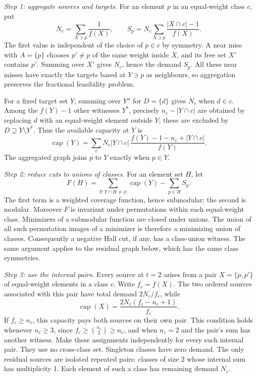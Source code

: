 \documentclass[11pt]{article}
\theoremstyle{plain}
\begin{document}
\emph{Step 1: aggregate sources and targets.} For an element $p$ in an equal-weight class $c$, put
\[
N_c=\sum_{X\ni p}\frac1{f(X)},\qquad
S_p=N_c\sum_{X\ni p}\frac{|X\cap c|-1}{f(X)}.
\]
The first value is independent of the choice of $p\in c$ by symmetry. A near miss with $A=\{p\}$ chooses $p'\ne p$ of the same weight inside $X$, and its free set $X'$ contains $p'$. Summing over $X'$ gives $N_c$, hence the demand $S_p$. All these near misses have exactly the targets based at $Y\ni p$ as neighbours, so aggregation preserves the fractional feasibility problem.

For a fixed target set $Y$, summing over $Y''$ for $D=\{d\}$ gives $N_c$ when $d\in c$. Among the $f(Y)-1$ other witnesses $Y^*$, precisely $n_c-|Y\cap c|$ are obtained by replacing $d$ with an equal-weight element outside $Y$; these are excluded by $D\supseteq Y\setminus Y^*$. Thus the available capacity at $Y$ is
\[
\operatorname{cap}(Y)=\sum_c N_c|Y\cap c|\,
\frac{f(Y)-1-n_c+|Y\cap c|}{f(Y)}.
\]
The aggregated graph joins $p$ to $Y$ exactly when $p\in Y$.

\emph{Step 2: reduce cuts to unions of classes.} For an element set $H$, let
\[
F(H)=\sum_{Y:Y\cap H\ne\varnothing}\operatorname{cap}(Y)-\sum_{p\in H}S_p.
\]
The first term is a weighted coverage function, hence submodular; the second is modular. Moreover $F$ is invariant under permutations within each equal-weight class. Minimizers of a submodular function are closed under unions. The union of all such permutation images of a minimizer is therefore a minimizing union of classes. Consequently a negative Hall cut, if any, has a class-union witness. The same argument applies to the residual graph below, which has the same class symmetries.

\emph{Step 3: use the internal pairs.} Every source at $t=2$ arises from a pair $X=\{p,p'\}$ of equal-weight elements in a class $c$. Write $f_c=f(X)$. The two ordered sources associated with this pair have total demand $2N_c/f_c$, while
\[
\operatorname{cap}(X)=\frac{2N_c(f_c-n_c+1)}{f_c}.
\]
If $f_c\ge n_c$, this capacity pays both sources on their own pair. This condition holds whenever $n_c\ge3$, since $f_c\ge\binom{n_c}{2}\ge n_c$, and when $n_c=2$ and the pair's sum has another witness. Make these assignments independently for every such internal pair. They use no cross-class set. Singleton classes have zero demand. The only residual sources are isolated repeated pairs: classes of size 2 whose internal sum has multiplicity 1. Each element of such a class has remaining demand $N_c$.
\end{document}
